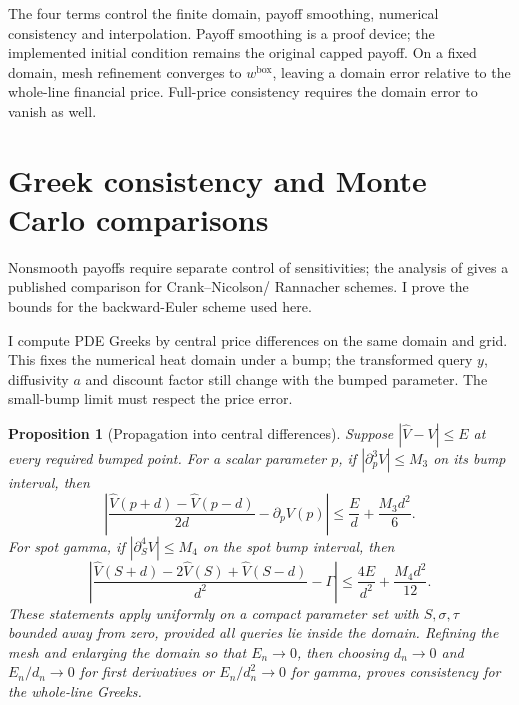 \documentclass[11pt]{article}
\newtheorem{proposition}[theorem]{Proposition}
\begin{document}
The four terms control the finite domain, payoff smoothing, numerical
consistency and interpolation. Payoff smoothing is a proof device; the
implemented initial condition remains the original capped payoff.
On a fixed domain, mesh refinement converges to
$w^{\mathrm{box}}$, leaving a domain error relative to the whole-line
financial price. Full-price consistency requires the domain error to
vanish as well.

\section{Greek consistency and Monte Carlo comparisons}
\label{sec:cgbm-greeks}

Nonsmooth payoffs require separate control of sensitivities; the analysis of 
\citet{gilescarter2006} gives a published comparison for Crank--Nicolson/
Rannacher schemes. I prove the bounds for the backward-Euler scheme used here.

I compute PDE Greeks by central price differences on the same domain and
grid. This fixes the numerical heat domain under a bump; the transformed
query $y$, diffusivity $a$ and discount factor still change with the bumped
parameter. The small-bump limit must respect the price error.

\begin{proposition}[Propagation into central differences]
\label{prop:cgbm-bumps}
Suppose $|\widehat V-V|\leq E$ at every required bumped point. For a scalar
parameter $p$, if $|\partial_p^3 V|\leq M_3$ on its bump interval, then
\begin{equation}
 \left|\frac{\widehat V(p+d)-\widehat V(p-d)}{2d}
 -\partial_p V(p)\right|
 \leq \frac{E}{d}+\frac{M_3d^2}{6}.
 \label{eq:cgbm-first-bump}
\end{equation}
For spot gamma, if $|\partial_S^4 V|\leq M_4$ on the spot bump interval,
then
\begin{equation}
 \left|\frac{\widehat V(S+d)-2\widehat V(S)+\widehat V(S-d)}{d^2}
 -\Gamma\right|
 \leq \frac{4E}{d^2}+\frac{M_4d^2}{12}.
 \label{eq:cgbm-second-bump}
\end{equation}
These statements apply uniformly on a compact parameter set with
$S,\sigma,\tau$ bounded away from zero, provided all queries lie inside
the domain. Refining the mesh and enlarging the domain so that $E_n\to0$,
then choosing $d_n\to0$ and $E_n/d_n\to0$ for first derivatives or
$E_n/d_n^2\to0$ for gamma, proves consistency for the whole-line Greeks.
\end{proposition}
\end{document}
